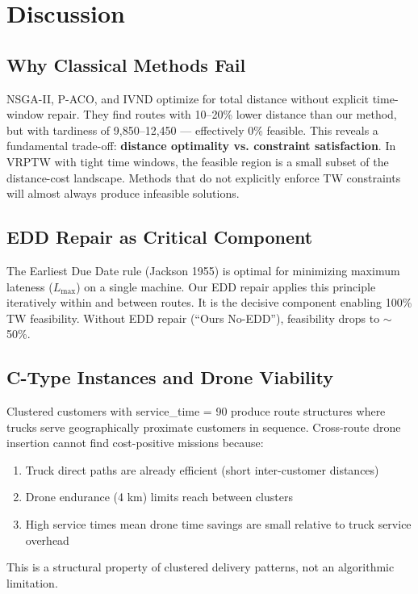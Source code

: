 \documentclass[11pt,a4paper]{article}
\begin{document}
\section{Discussion}

\subsection{Why Classical Methods Fail}

NSGA-II, P-ACO, and IVND optimize for total distance without explicit time-window
repair. They find routes with 10--20\% lower distance than our method, but with
tardiness of 9,850--12,450 — effectively 0\% feasible. This reveals a fundamental
trade-off: \textbf{distance optimality vs. constraint satisfaction}. In VRPTW with
tight time windows, the feasible region is a small subset of the distance-cost
landscape. Methods that do not explicitly enforce TW constraints will almost always
produce infeasible solutions.

\subsection{EDD Repair as Critical Component}

The Earliest Due Date rule (Jackson 1955) is optimal for minimizing maximum lateness
($L_{\max}$) on a single machine. Our EDD repair applies this principle iteratively
within and between routes. It is the decisive component enabling 100\% TW feasibility.
Without EDD repair (``Ours No-EDD''), feasibility drops to $\sim$50\%.

\subsection{C-Type Instances and Drone Viability}

Clustered customers with service\_time = 90 produce route structures where trucks
serve geographically proximate customers in sequence. Cross-route drone insertion
cannot find cost-positive missions because:
\begin{enumerate}
    \item Truck direct paths are already efficient (short inter-customer distances)
    \item Drone endurance (4 km) limits reach between clusters
    \item High service times mean drone time savings are small relative to truck
          service overhead
\end{enumerate}
This is a structural property of clustered delivery patterns, not an algorithmic
limitation.
\end{document}
